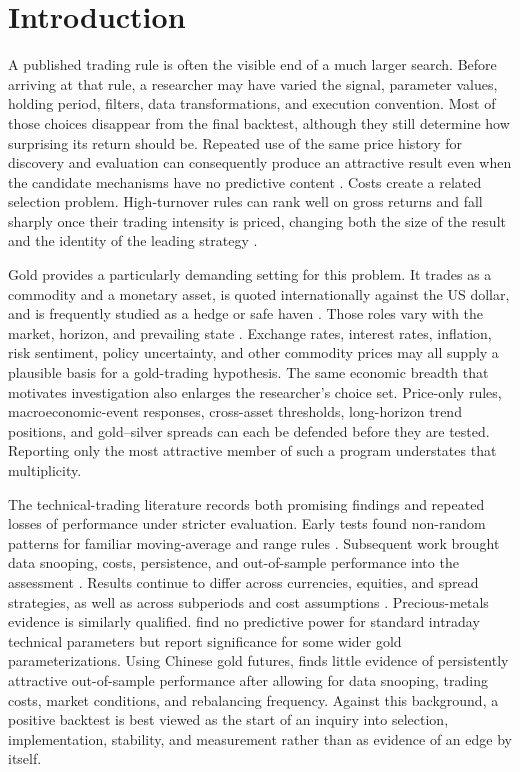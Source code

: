 \section{Introduction}\label{sec:introduction}

A published trading rule is often the visible end of a much larger search. Before arriving at that rule, a researcher may have varied the signal, parameter values, holding period, filters, data transformations, and execution convention. Most of those choices disappear from the final backtest, although they still determine how surprising its return should be. Repeated use of the same price history for discovery and evaluation can consequently produce an attractive result even when the candidate mechanisms have no predictive content \citep{white2000,sullivan1999}. Costs create a related selection problem. High-turnover rules can rank well on gross returns and fall sharply once their trading intensity is priced, changing both the size of the result and the identity of the leading strategy \citep{bajgrowicz2012}.

Gold provides a particularly demanding setting for this problem. It trades as a commodity and a monetary asset, is quoted internationally against the US dollar, and is frequently studied as a hedge or safe haven \citep{baur2010hedge,baur2010safe}. Those roles vary with the market, horizon, and prevailing state \citep{gurdgiev2024,ryan2024,faraj2025,xu2026}. Exchange rates, interest rates, inflation, risk sentiment, policy uncertainty, and other commodity prices may all supply a plausible basis for a gold-trading hypothesis. The same economic breadth that motivates investigation also enlarges the researcher's choice set. Price-only rules, macroeconomic-event responses, cross-asset thresholds, long-horizon trend positions, and gold--silver spreads can each be defended before they are tested. Reporting only the most attractive member of such a program understates that multiplicity.

The technical-trading literature records both promising findings and repeated losses of performance under stricter evaluation. Early tests found non-random patterns for familiar moving-average and range rules \citep{brock1992}. Subsequent work brought data snooping, costs, persistence, and out-of-sample performance into the assessment \citep{hsu2010,bajgrowicz2012}. Results continue to differ across currencies, equities, and spread strategies, as well as across subperiods and cost assumptions \citep{dockery2023,psaradellis2023,rink2023,song2025}. Precious-metals evidence is similarly qualified. \citet{batten2018} find no predictive power for standard intraday technical parameters but report significance for some wider gold parameterizations. Using Chinese gold futures, \citet{jin2022} finds little evidence of persistently attractive out-of-sample performance after allowing for data snooping, trading costs, market conditions, and rebalancing frequency. Against this background, a positive backtest is best viewed as the start of an inquiry into selection, implementation, stability, and measurement rather than as evidence of an edge by itself.


